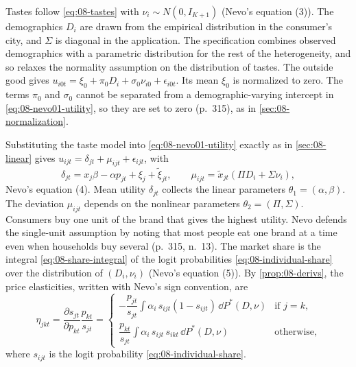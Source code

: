 Tastes follow \eqref{eq:08-tastes} with $\nu_i \sim N(0, I_{K+1})$ (Nevo's equation (3)). The demographics $D_i$ are
drawn from the empirical distribution in the consumer's city, and $\Sigma$ is diagonal in the application. The
specification combines observed demographics with a parametric distribution for the rest of the heterogeneity,
and so relaxes the normality assumption on the distribution of tastes. The outside good gives
$u_{i0t} = \xi_0 + \pi_0 D_i + \sigma_0 \nu_{i0} + \epsilon_{i0t}$. Its mean $\xi_0$ is normalized to zero.
The terms $\pi_0$ and $\sigma_0$ cannot be separated from a demographic-varying intercept in
\eqref{eq:08-nevo01-utility}, so they are set to zero (p.~315), as in \cref{sec:08-normalization}.

Substituting the taste model into \eqref{eq:08-nevo01-utility} exactly as in \cref{sec:08-linear} gives
$u_{ijt} = \delta_{jt} + \mu_{ijt} + \epsilon_{ijt}$, with
\begin{equation}\label{eq:08-nevo-decomp}
\delta_{jt} = x_j\beta - \alpha p_{jt} + \xi_j + \tilde\xi_{jt},
\qquad \mu_{ijt} = \tilde x_{jt}(\Pi D_i + \Sigma\nu_i),
\end{equation}
Nevo's equation (4). Mean utility $\delta_{jt}$ collects the linear parameters $\theta_1 = (\alpha, \beta)$. The
deviation $\mu_{ijt}$ depends on the nonlinear parameters $\theta_2 = (\Pi, \Sigma)$. Consumers buy one unit of the
brand that gives the highest utility. Nevo defends the single-unit assumption by noting that most people eat one
brand at a time even when households buy several (p.~315, n.~13). The market share is the integral
\eqref{eq:08-share-integral} of the logit probabilities \eqref{eq:08-individual-share} over the distribution of
$(D_i, \nu_i)$ (Nevo's equation (5)). By \cref{prop:08-derivs}, the price elasticities, written with Nevo's sign
convention, are
\begin{equation}\label{eq:08-nevo-elas}
\eta_{jkt} = \frac{\partial s_{jt}}{\partial p_{kt}}\frac{p_{kt}}{s_{jt}} =
\begin{cases}
-\dfrac{p_{jt}}{s_{jt}} \displaystyle\int \alpha_i\, s_{ijt}(1 - s_{ijt})\,\dd P^*(D,\nu) & \text{if } j = k,\\[2ex]
\dfrac{p_{kt}}{s_{jt}} \displaystyle\int \alpha_i\, s_{ijt}\, s_{ikt}\,\dd P^*(D,\nu) & \text{otherwise},
\end{cases}
\end{equation}
where $s_{ijt}$ is the logit probability \eqref{eq:08-individual-share}.

